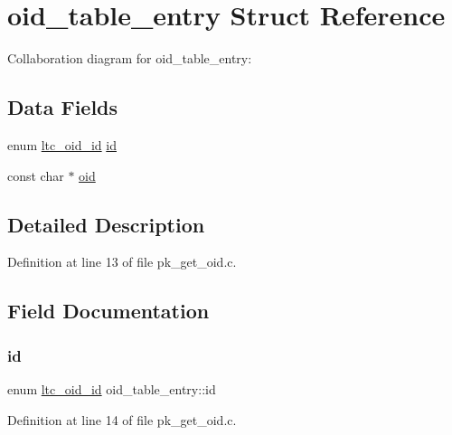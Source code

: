 \hypertarget{structoid__table__entry}{}\section{oid\+\_\+table\+\_\+entry Struct Reference}
\label{structoid__table__entry}


Collaboration diagram for oid\+\_\+table\+\_\+entry\+:
\subsection*{Data Fields}
\begin{DoxyCompactItemize}
\item 
enum \mbox{\hyperlink{tomcrypt__private_8h_a981c610adcaa77d61adb80dde41a044b}{ltc\+\_\+oid\+\_\+id}} \mbox{\hyperlink{structoid__table__entry_a3e3c22a712c3caaf9fd6daffdc01da73}{id}}
\item 
const char $\ast$ \mbox{\hyperlink{structoid__table__entry_ae3be974f1f46a4a102d3bab52ef0cf36}{oid}}
\end{DoxyCompactItemize}


\subsection{Detailed Description}


Definition at line 13 of file pk\+\_\+get\+\_\+oid.\+c.



\subsection{Field Documentation}
\mbox{\label{structoid__table__entry_a3e3c22a712c3caaf9fd6daffdc01da73}} 
\subsubsection{\texorpdfstring{id}{id}}
{\footnotesize\ttfamily enum \mbox{\hyperlink{tomcrypt__private_8h_a981c610adcaa77d61adb80dde41a044b}{ltc\+\_\+oid\+\_\+id}} oid\+\_\+table\+\_\+entry\+::id}



Definition at line 14 of file pk\+\_\+get\+\_\+oid.\+c.

\mbox{\label{structoid__table__entry_ae3be974f1f46a4a102d3bab52ef0cf36}} 
